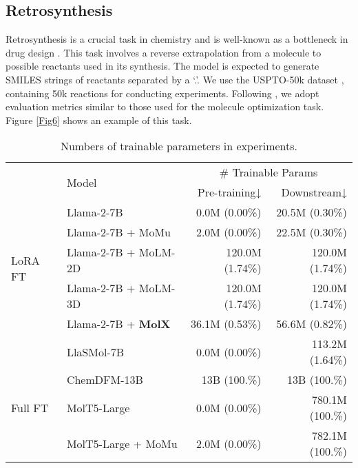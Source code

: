 \subsection{Retrosynthesis}
Retrosynthesis is a crucial task in chemistry and is well-known as a bottleneck in drug design \cite{oliveira2022machine}. This task involves a reverse extrapolation from a molecule to possible reactants used in its synthesis. The model is expected to generate SMILES strings of reactants separated by a ‘.’. We use the USPTO-50k dataset \cite{schneider2016s}, containing 50k reactions for conducting experiments. Following \cite{edwards2022translation}, we adopt evaluation metrics similar to those used for the molecule optimization task. Figure \ref{Fig6} shows an example of this task. 

\begin{table}[!ht]
\centering
\caption{Numbers of trainable parameters in experiments.}
\label{efficiency}
\setlength{\tabcolsep}{2.99pt}
\renewcommand{\arraystretch}{0.90}
\scriptsize

\begin{tabular*}{\linewidth}{@{\extracolsep{\fill}}ll|rr}
\toprule

\multirow[t]{2}{*}{} &\multirow[t]{2}{*}{Model} &\multicolumn{2}{c}{\# Trainable Params} \\
& &Pre-training↓ &Downstream↓ \\
\midrule
\multirow[t]{5}{*}{LoRA FT}
&Llama-2-7B                 &   0.0M (0.00\%) &  20.5M (0.30\%) \\
&Llama-2-7B + MoMu          &   2.0M (0.00\%) &  22.5M (0.30\%) \\
&Llama-2-7B + MoLM-2D       & 120.0M (1.74\%) & 120.0M (1.74\%) \\
&Llama-2-7B + MoLM-3D       & 120.0M (1.74\%) & 120.0M (1.74\%) \\
&Llama-2-7B + \textbf{MolX} &  36.1M (0.53\%) &  56.6M (0.82\%) \\
\rowcolor{customgray}
&LlaSMol-7B                 &   0.0M (0.00\%) & 113.2M (1.64\%) \\
\rowcolor{customgray}
&ChemDFM-13B                &    13B (100.\%) &   13B (100.\%) \\
\midrule
Full FT
&MolT5-Large                &   0.0M (0.00\%) & 780.1M (100.\%) \\
&MolT5-Large + MoMu         &   2.0M (0.00\%) & 782.1M (100.\%) \\

\bottomrule
\end{tabular*}
\end{table}

